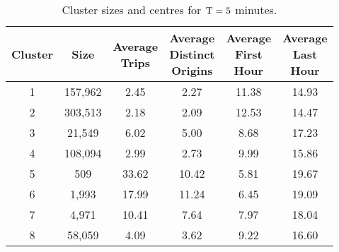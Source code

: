 \begin{table}[t]
\centering
\tabcolsep=0.15cm
\begin{tabular}{c c c c c c}
  \hline
 Cluster & Size & \thead{Average\\Trips} & \thead{Average\\Distinct\\Origins} & \thead{Average\\First\\Hour} & \thead{Average\\Last\\Hour} \\
  \hline
1 & 157,962 & 2.45 & 2.27 & 11.38 & 14.93 \\
  2 & 303,513 & 2.18 & 2.09 & 12.53 & 14.47 \\
  3 & 21,549 & 6.02 & 5.00 & 8.68 & 17.23 \\
  4 & 108,094 & 2.99 & 2.73 & 9.99 & 15.86 \\
  5 & 509 & 33.62 & 10.42 & 5.81 & 19.67 \\
  6 & 1,993 & 17.99 & 11.24 & 6.45 & 19.09 \\
  7 & 4,971 & 10.41 & 7.64 & 7.97 & 18.04 \\
  8 & 58,059 & 4.09 & 3.62 & 9.22 & 16.60 \\
   \hline
\end{tabular}
\caption{Cluster sizes and centres for $\mathrm{T} = 5$ minutes.}
\label{t:kmeans_centers_300}
\end{table}
